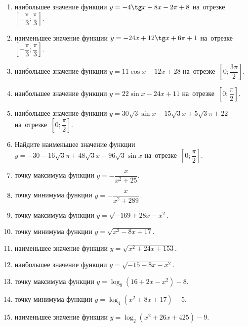 \documentclass[a4paper,10pt]{article}
\begin{document}
\begin{enumerate}
\item {} наибольшее значение функции $y=-4\tg x +8x-2\pi +8$ на~отрезке~$\left[-\dfrac{\pi}{3};\dfrac{\pi}{3}\right]$.

\item {} наименьшее значение функции $y=-24x +12\tg x+6\pi+1$ на~отрезке~$\left[-\dfrac{\pi}{3};\dfrac{\pi}{3}\right]$.

\item {} наибольшее значение функции $y=11\cos x-12x+28$ на~отрезке~$\left[0;\dfrac{3\pi}{2}\right]$.

\item {} наибольшее значение функции $y=22\sin x-24x+11$ на~отрезке~$\left[0;\dfrac{\pi}{2}\right]$.

\item {} наибольшее значение функции $y=30\sqrt{3}\sin x-15\sqrt{3}x+5\sqrt{3}\pi +22$ на~отрезке~$\left[0;\dfrac{\pi}{2}\right]$.

\item Найдите наименьшее значение функции $y=-30-16\sqrt{3}\pi+48\sqrt{3}x-96\sqrt{3}\sin x$ на~отрезке~$\left[0;\dfrac{\pi}{2}\right]$.

\item {} точку максимума функции $y=-\dfrac{x}{ x^2 +25}$.

\item {} точку минимума функции $y=-\dfrac{x}{ x^2 +289}$.

\item {} точку максимума функции $y=\sqrt{-169+28x-x^2}$.

\item {} точку минимума функции $y=\sqrt{x^2-8x+17}$.

\item {} наименьшее значение функции $y=\sqrt{x^2+24x+153}$.

\item {} наибольшее значение функции $y=\sqrt{-15-8x-x^2}$.

\item {} точку максимума функции $y=\log_9\left(16+2x-x^2\right)-8$.

\item {} точку минимума функции $y=\log_4\left(x^2+8x+17\right)-5$.

\item {} наименьшее значение функции $y=\log_2\left(x^2+26x+425\right)-9$.


\end{enumerate}
\end{document}
